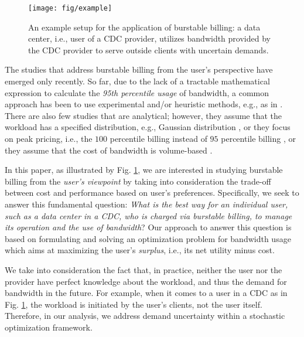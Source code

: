 \documentclass[10pt,journal,compsoc]{IEEEtran}
\begin{document}
\begin{figure}[t]
	\centering
	\texttt{[image: fig/example]}
	\caption{An example setup for the application of burstable billing: a data center, i.e., user of a CDC provider, utilizes bandwidth provided by the CDC provider to serve outside clients with uncertain demands.} \vspace{-0.2cm}\label{fig:example}
\end{figure}




The studies that address burstable billing from the user's perspective have emerged only recently. So far, due to the lack of a tractable mathematical expression to calculate the \emph{95th percentile usage} of bandwidth, a common approach has been to use experimental and/or heuristic methods, e.g., as in \cite{Traverso2015,Golubchik2013,Laoutaris2011, Nandagopal2012, Marcon2011, Stanojevic2011}. There are also few studies that are analytical; however, they assume that the workload has a specified distribution, e.g., Gaussian distribution \cite{Xu2012}, or they focus on peak pricing, i.e., the $100$ percentile billing instead of $95$ percentile billing \cite{Zhang2014}, or they assume that the cost of bandwidth is volume-based \cite{Xu2013,Xiang2014a}.




In this paper, as illustrated by Fig. \ref{fig:example},  we are interested in studying burstable billing from the \emph{user's viewpoint} by taking into consideration the trade-off between cost and performance based on user's preferences. Specifically, we seek to answer this fundamental question: \emph{What is the best way for an individual user, such as a data center in a CDC, who is charged via burstable billing, to manage its operation and the use of bandwidth}? Our approach to answer this question is based on formulating and solving an optimization problem for bandwidth usage which aims at maximizing the user's \emph{surplus}, i.e., its net utility minus cost.


We take into consideration the fact that, in practice, neither the user nor the provider have perfect knowledge about the workload, and thus the demand for bandwidth in the future. For example, when it comes to a user in a CDC as in Fig. \ref{fig:example}, the workload is initiated by the user's clients, not the user itself. Therefore, in our analysis, we address demand uncertainty within a stochastic optimization framework.
\end{document}

